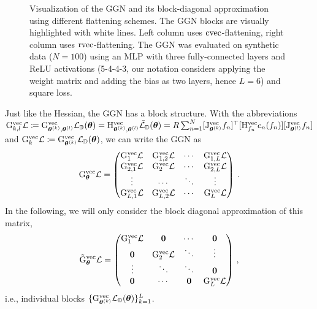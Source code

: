 \begin{figure}
\begin{minipage}[t]{0.495\linewidth}
  \end{minipage}
  \caption{Visualization of the GGN and its block-diagonal approximation using different flattening schemes.
    The GGN blocks are visually highlighted with white lines.
    Left column uses $\operatorname{cvec}$-flattening, right column uses $\operatorname{rvec}$-flattening.
    The GGN was evaluated on synthetic data ($N=100$) using an MLP with three fully-connected layers and ReLU activations (5-4-4-3, our notation considers applying the weight matrix and adding the bias as two layers, hence $L=6$) and square loss.
  }
\end{figure}

\switchcolumn[0]
Just like the Hessian, the GGN has a block structure. With the abbreviations
$\mathrm{G}_{k,l}^{\operatorname{vec}}{\mathcal{L}} \coloneq \mathrm{G}^{\operatorname{vec}}_{{\bm{\theta}}^{(k)}, {\bm{\theta}}^{(l)}} {\mathcal{L}}_{{\mathbb{D}}}({\bm{\theta}}) = \mathrm{H}^{\operatorname{vec}}_{{\bm{\theta}}^{(k)}, {\bm{\theta}}^{(l)}} \tilde{{\mathcal{L}}}_{{\mathbb{D}}}({\bm{\theta}}) = R \sum_{n=1}^N [\mathrm{J}_{{\bm{\theta}}^{(k)}}^{\operatorname{vec}} f_n]^{\top} [\mathrm{H}^{\operatorname{vec}}_{f_n} c_n(f_n)] [\mathrm{J}_{{\bm{\theta}}^{(l)}}^{\operatorname{vec}} f_n]$ and $\mathrm{G}_{k}^{\operatorname{vec}}{\mathcal{L}} \coloneq \mathrm{G}^{\operatorname{vec}}_{{\bm{\theta}}^{(k)}} {\mathcal{L}}_{{\mathbb{D}}}({\bm{\theta}})$, we can write the GGN as
\begin{align*}
  \mathrm{G}_{{\bm{\theta}}}^{\operatorname{vec}} {\mathcal{L}}
  =
  \begin{pmatrix}
    \mathrm{G}_1^{\operatorname{vec}} {\mathcal{L}}
    &
      \mathrm{G}_{1, 2}^{\operatorname{vec}} {\mathcal{L}}
    &
      \cdots
    &
      \mathrm{G}_{1, L}^{\operatorname{vec}} {\mathcal{L}}
    \\
    \mathrm{G}_{2, 1}^{\operatorname{vec}} {\mathcal{L}}
    &
      \mathrm{G}_2^{\operatorname{vec}} {\mathcal{L}}
    &
      \cdots
    &
      \mathrm{G}_{2, L}^{\operatorname{vec}} {\mathcal{L}}
    \\
    \vdots & \cdots & \ddots & \vdots
    \\
    \mathrm{G}_{L, 1}^{\operatorname{vec}} {\mathcal{L}}
    &
      \mathrm{G}_{L, 2}^{\operatorname{vec}} {\mathcal{L}}
    &
      \cdots
    &
      \mathrm{G}_L^{\operatorname{vec}} {\mathcal{L}}
  \end{pmatrix}\,.
\end{align*}
In the following, we will only consider the block diagonal approximation of this matrix,
\begin{align*}
  \tilde{\mathrm{G}}_{{\bm{\theta}}}^{\operatorname{vec}} {\mathcal{L}}
  =
  \begin{pmatrix}
    \mathrm{G}_1^{\operatorname{vec}} {\mathcal{L}} & {\bm{0}} & \cdots & {\bm{0}}
    \\
    {\bm{0}} & \mathrm{G}_2^{\operatorname{vec}} {\mathcal{L}} & \ddots & \vdots
    \\
    \vdots & \ddots & \ddots & {\bm{0}}
    \\
    {\bm{0}} & \cdots & {\bm{0}} & \mathrm{G}_L^{\operatorname{vec}} {\mathcal{L}}
  \end{pmatrix}\,,
\end{align*}
i.e., individual blocks $\{ \mathrm{G}_{{\bm{\theta}}^{(k)}}^{\operatorname{vec}} {\mathcal{L}}_{{\mathbb{D}}}({\bm{\theta}})\}_{k=1}^L$.

